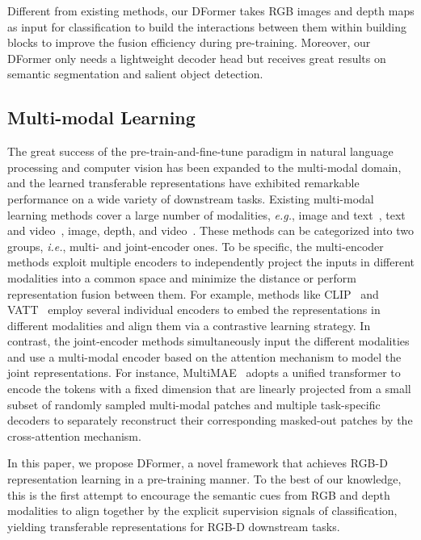 \documentclass{article}
\newcommand{\nMethod}{DFormer}
\begin{document}
Different from existing methods, our \nMethod{} takes RGB images and depth maps as input for classification to build the interactions between them within building blocks to improve the fusion efficiency during pre-training.
Moreover, our \nMethod{} only needs a lightweight decoder head but receives great results on semantic segmentation and salient object detection.



\subsection{Multi-modal Learning}
The great success of the pre-train-and-fine-tune paradigm in natural language processing and computer vision has been expanded to the multi-modal domain, and the learned transferable representations have exhibited remarkable performance on a wide variety of downstream tasks.
Existing multi-modal learning methods cover a large number of modalities, \emph{e.g.}, image and text~\citep{castrejon2016learning,chen2020uniter,radford2021learning,zhang2021rstnet,wu2022difnet}, text and video~\citep{akbari2021vatt}, image, depth, and video~\citep{girdhar2022omnivore}.
These methods can be categorized into two groups, \emph{i.e.}, multi- and joint-encoder ones.
To be specific, the multi-encoder methods exploit multiple encoders to independently project the inputs in different modalities into a common space and minimize the distance or perform representation fusion between them.
For example, methods like CLIP~\citep{radford2021learning} and VATT~\citep{akbari2021vatt} employ several individual encoders to embed the representations in different modalities and align them via a contrastive learning strategy.
In contrast, the joint-encoder methods simultaneously input the different modalities and use a multi-modal encoder based on the attention mechanism to model the joint representations.
For instance, MultiMAE~\citep{bachmann2022multimae} adopts a unified transformer to encode the tokens with a fixed dimension that are linearly projected from a small subset of randomly sampled multi-modal patches and multiple task-specific decoders to separately reconstruct their corresponding masked-out patches by the cross-attention mechanism.

In this paper, we propose \nMethod{}, a novel framework that achieves RGB-D representation learning in a pre-training manner.
To the best of our knowledge, this is the first attempt to encourage the semantic cues from RGB and depth modalities to align together by the explicit supervision signals of classification, yielding transferable representations for RGB-D downstream tasks.
\end{document}
